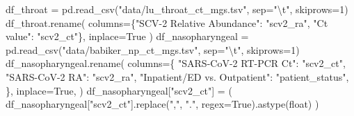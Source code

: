 \documentclass[
  letterpaper,
  DIV=11,
  numbers=noendperiod]{scrartcl}
\newenvironment{Shaded}{\begin{snugshade}}{\end{snugshade}}
\newcommand{\BuiltInTok}[1]{\textcolor[rgb]{0.00,0.23,0.31}{#1}}
\newcommand{\CharTok}[1]{\textcolor[rgb]{0.13,0.47,0.30}{#1}}
\newcommand{\DecValTok}[1]{\textcolor[rgb]{0.68,0.00,0.00}{#1}}
\newcommand{\NormalTok}[1]{\textcolor[rgb]{0.00,0.23,0.31}{#1}}
\newcommand{\OperatorTok}[1]{\textcolor[rgb]{0.37,0.37,0.37}{#1}}
\newcommand{\StringTok}[1]{\textcolor[rgb]{0.13,0.47,0.30}{#1}}
\newcommand{\VariableTok}[1]{\textcolor[rgb]{0.07,0.07,0.07}{#1}}
\begin{document}
\begin{Shaded}
\begin{Highlighting}[]
\NormalTok{df\_throat }\OperatorTok{=}\NormalTok{ pd.read\_csv(}\StringTok{"data/lu\_throat\_ct\_mgs.tsv"}\NormalTok{, sep}\OperatorTok{=}\StringTok{"}\CharTok{\textbackslash{}t}\StringTok{"}\NormalTok{, skiprows}\OperatorTok{=}\DecValTok{1}\NormalTok{)}
\NormalTok{df\_throat.rename(}
\NormalTok{    columns}\OperatorTok{=}\NormalTok{\{}\StringTok{"SCV{-}2 Relative Abundance"}\NormalTok{: }\StringTok{"scv2\_ra"}\NormalTok{, }\StringTok{"Ct value"}\NormalTok{: }\StringTok{"scv2\_ct"}\NormalTok{\}, inplace}\OperatorTok{=}\VariableTok{True}
\NormalTok{)}
\NormalTok{df\_nasopharyngeal }\OperatorTok{=}\NormalTok{ pd.read\_csv(}\StringTok{"data/babiker\_np\_ct\_mgs.tsv"}\NormalTok{, sep}\OperatorTok{=}\StringTok{"}\CharTok{\textbackslash{}t}\StringTok{"}\NormalTok{, skiprows}\OperatorTok{=}\DecValTok{1}\NormalTok{)}
\NormalTok{df\_nasopharyngeal.rename(}
\NormalTok{    columns}\OperatorTok{=}\NormalTok{\{}
        \StringTok{"SARS{-}CoV{-}2 RT{-}PCR Ct"}\NormalTok{: }\StringTok{"scv2\_ct"}\NormalTok{,}
        \StringTok{"SARS{-}CoV{-}2 RA"}\NormalTok{: }\StringTok{"scv2\_ra"}\NormalTok{,}
        \StringTok{"Inpatient/ED vs. Outpatient"}\NormalTok{: }\StringTok{"patient\_status"}\NormalTok{,}
\NormalTok{    \},}
\NormalTok{    inplace}\OperatorTok{=}\VariableTok{True}\NormalTok{,}
\NormalTok{)}
\NormalTok{df\_nasopharyngeal[}\StringTok{"scv2\_ct"}\NormalTok{] }\OperatorTok{=}\NormalTok{ (}
\NormalTok{    df\_nasopharyngeal[}\StringTok{"scv2\_ct"}\NormalTok{].replace(}\StringTok{","}\NormalTok{, }\StringTok{"."}\NormalTok{, regex}\OperatorTok{=}\VariableTok{True}\NormalTok{).astype(}\BuiltInTok{float}\NormalTok{)}
\NormalTok{)}


\end{Highlighting}
\end{Shaded}
\end{document}
